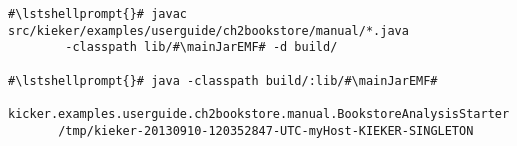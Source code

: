 \begin{lstlisting}[caption=Commands to compile and run the analysis under \UnixLikeSystems{},label=lst:bookstoreAnalysisStarterLinux] 			
#\lstshellprompt{}# javac src/kieker/examples/userguide/ch2bookstore/manual/*.java 
        -classpath lib/#\mainJarEMF# -d build/

#\lstshellprompt{}# java -classpath build/:lib/#\mainJarEMF#
       kicker.examples.userguide.ch2bookstore.manual.BookstoreAnalysisStarter 
       /tmp/kieker-20130910-120352847-UTC-myHost-KIEKER-SINGLETON
\end{lstlisting}	